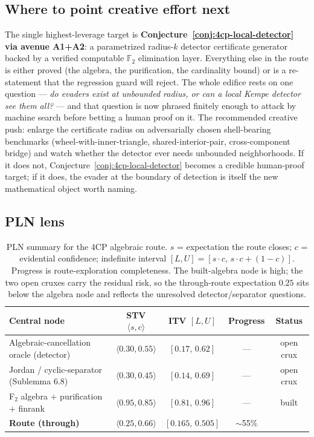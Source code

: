 \subsection{Where to point creative effort next}

The single highest-leverage target is
\textbf{Conjecture~\ref{conj:4cp-local-detector} via avenue A1+A2}: a
parametrized radius-$k$ detector certificate generator backed by a verified
computable $\mathbb{F}_2$ elimination layer. Everything else in the route is
either proved (the algebra, the purification, the cardinality bound) or is a
re-statement that the regression guard will reject. The whole edifice rests on
one question --- \emph{do evaders exist at unbounded radius, or can a local
Kempe detector see them all?} --- and that question is now phrased finitely
enough to attack by machine search before betting a human proof on it. The
recommended creative push: enlarge the certificate radius on adversarially
chosen shell-bearing benchmarks (wheel-with-inner-triangle, shared-interior-pair,
cross-component bridge) and watch whether the detector ever needs unbounded
neighborhoods. If it does not, Conjecture~\ref{conj:4cp-local-detector} becomes
a credible human-proof target; if it does, the evader at the boundary of
detection is itself the new mathematical object worth naming.

\subsection*{PLN lens}

\begin{table}[h]
\centering
\small
\begin{tabular}{lcccc}
\toprule
Central node & STV $\langle s,c\rangle$ & ITV $[L,U]$ & Progress & Status \\
\midrule
Algebraic-cancellation oracle (detector) & $\langle 0.30, 0.55\rangle$ & $[0.17,\,0.62]$ & --- & open crux \\
Jordan / cyclic-separator (Sublemma 6.8) & $\langle 0.30, 0.45\rangle$ & $[0.14,\,0.69]$ & --- & open crux \\
F$_2$ algebra + purification + finrank   & $\langle 0.95, 0.85\rangle$ & $[0.81,\,0.96]$ & --- & built \\
\midrule
\textbf{Route (through)} & $\langle 0.25, 0.66\rangle$ & $[0.165,\,0.505]$ & $\sim$55\% & \\
\bottomrule
\end{tabular}
\caption{PLN summary for the 4CP algebraic route. $s$ = expectation the route
closes; $c$ = evidential confidence; indefinite interval $[L,U]=[s\cdot c,\,
s\cdot c+(1-c)]$. Progress is route-exploration completeness. The built-algebra
node is high; the two open cruxes carry the residual risk, so the through-route
expectation $0.25$ sits below the algebra node and reflects the unresolved
detector/separator questions.}
\end{table}

